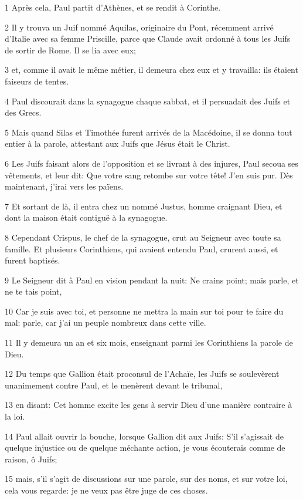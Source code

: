\par 1 Après cela, Paul partit d'Athènes, et se rendit à Corinthe.
\par 2 Il y trouva un Juif nommé Aquilas, originaire du Pont, récemment arrivé d'Italie avec sa femme Priscille, parce que Claude avait ordonné à tous les Juifs de sortir de Rome. Il se lia avec eux;
\par 3 et, comme il avait le même métier, il demeura chez eux et y travailla: ils étaient faiseurs de tentes.
\par 4 Paul discourait dans la synagogue chaque sabbat, et il persuadait des Juifs et des Grecs.
\par 5 Mais quand Silas et Timothée furent arrivés de la Macédoine, il se donna tout entier à la parole, attestant aux Juifs que Jésus était le Christ.
\par 6 Les Juifs faisant alors de l'opposition et se livrant à des injures, Paul secoua ses vêtements, et leur dit: Que votre sang retombe sur votre tête! J'en suis pur. Dès maintenant, j'irai vers les païens.
\par 7 Et sortant de là, il entra chez un nommé Justus, homme craignant Dieu, et dont la maison était contiguë à la synagogue.
\par 8 Cependant Crispus, le chef de la synagogue, crut au Seigneur avec toute sa famille. Et plusieurs Corinthiens, qui avaient entendu Paul, crurent aussi, et furent baptisés.
\par 9 Le Seigneur dit à Paul en vision pendant la nuit: Ne crains point; mais parle, et ne te tais point,
\par 10 Car je suis avec toi, et personne ne mettra la main sur toi pour te faire du mal: parle, car j'ai un peuple nombreux dans cette ville.
\par 11 Il y demeura un an et six mois, enseignant parmi les Corinthiens la parole de Dieu.
\par 12 Du temps que Gallion était proconsul de l'Achaïe, les Juifs se soulevèrent unanimement contre Paul, et le menèrent devant le tribunal,
\par 13 en disant: Cet homme excite les gens à servir Dieu d'une manière contraire à la loi.
\par 14 Paul allait ouvrir la bouche, lorsque Gallion dit aux Juifs: S'il s'agissait de quelque injustice ou de quelque méchante action, je vous écouterais comme de raison, ô Juifs;
\par 15 mais, s'il s'agit de discussions sur une parole, sur des noms, et sur votre loi, cela vous regarde: je ne veux pas être juge de ces choses.
